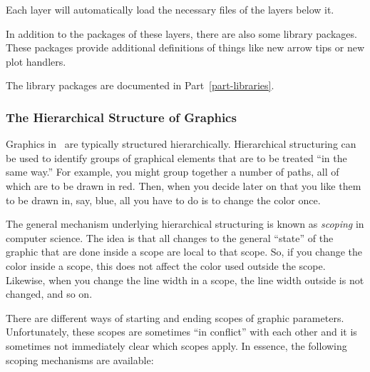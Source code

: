 Each layer will automatically load the necessary files of the layers below
it.

In addition to the packages of these layers, there are also some
library packages. These packages provide additional definitions of
things like new arrow tips or new plot handlers.

The library packages are documented in Part~\ref{part-libraries}.




\subsubsection{The Hierarchical Structure of Graphics}

Graphics in \pgfname\ are typically structured
hierarchically. Hierarchical structuring can be used to identify
groups of graphical elements that are to be treated ``in the same
way.'' For example, you might group together a number of paths, all of
which are to be drawn in red. Then, when you decide later on that you
like them to be drawn in, say, blue, all you have to do is to change
the color once.

The general mechanism underlying hierarchical structuring is known as
\emph{scoping} in computer science. The idea is that all changes to
the general ``state'' of the graphic that are done inside a scope are
local to that scope. So, if you change the color inside a scope, this
does not affect the color used outside the scope. Likewise, when you
change the line width in a scope, the line width outside is not
changed, and so on.

There are different ways of starting and ending scopes of graphic
parameters. Unfortunately, these scopes are sometimes ``in conflict''
with each other and it is sometimes not immediately clear which scopes
apply. In essence, the following scoping mechanisms are available:


